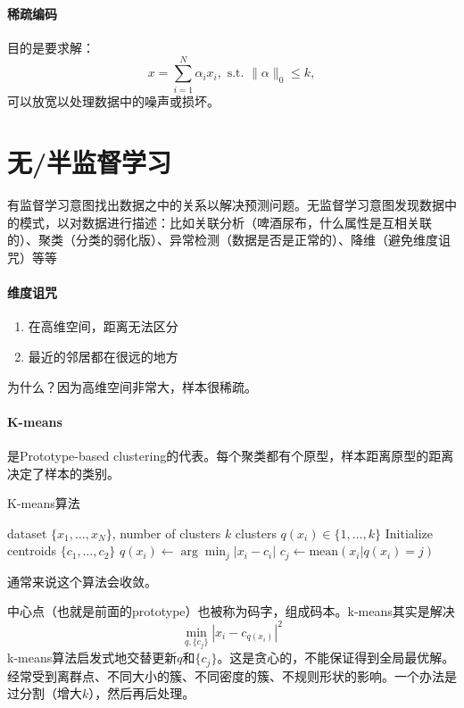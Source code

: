 \paragraph{稀疏编码} 目的是要求解：
$$x = \sum^N_{i=1} \alpha_ix_i,\text{ s.t. } \|\alpha\|_0 \le k,$$
可以放宽以处理数据中的噪声或损坏。

\section{无/半监督学习}
有监督学习意图找出数据之中的关系以解决预测问题。无监督学习意图发现数据中的模式，以对数据进行描述：比如关联分析（啤酒尿布，什么属性是互相关联的）、聚类（分类的弱化版）、异常检测（数据是否是正常的）、降维（避免维度诅咒）等等

\paragraph{维度诅咒}
\begin{enumerate}
    \item 在高维空间，距离无法区分 
    \item 最近的邻居都在很远的地方
\end{enumerate}
为什么？因为高维空间非常大，样本很稀疏。

\paragraph{K-means} 是Prototype-based clustering的代表。每个聚类都有个原型，样本距离原型的距离决定了样本的类别。
\begin{algorithm}[H]
\caption{K-means算法}
\label{alg:K-means}
\begin{algorithmic}[1]
\Require dataset $\{x_1, \ldots, x_N\}$, number of clusters $k$
\Ensure clusters $q(x_i)\in\{1, \ldots, k\}$
\State Initialize centroids $\{c_1, \ldots, c_2\}$
\Repeat
{}
\State $q(x_i) \leftarrow \arg \min_j |x_i - c_i|$
\EndFor
{}
\State $c_j \leftarrow \mathrm{mean}(x_i|q(x_i) = j)$
\EndFor
{}
\end{algorithmic}
\end{algorithm}
通常来说这个算法会收敛。

中心点（也就是前面的prototype）也被称为码字，组成码本。k-means其实是解决
$$\min_{q,\{c_j\}} |x_i - c_{q(x_i)}|^2$$
k-means算法启发式地交替更新$q$和$\{c_j\}$。这是贪心的，不能保证得到全局最优解。经常受到离群点、不同大小的簇、不同密度的簇、不规则形状的影响。一个办法是过分割（增大$k$），然后再后处理。

